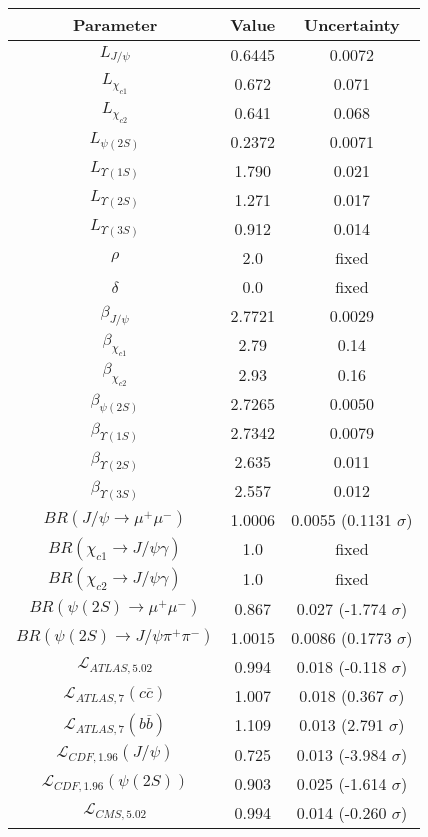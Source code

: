 \begin{table}[h!]
\centering
\begin{tabular}{c|c|c}
Parameter & Value & Uncertainty \\
\hline
$L_{J/\psi}$ & 0.6445 & 0.0072 \\
$L_{\chi_{c1}}$ & 0.672 & 0.071 \\
$L_{\chi_{c2}}$ & 0.641 & 0.068 \\
$L_{\psi(2S)}$ & 0.2372 & 0.0071 \\
$L_{\Upsilon(1S)}$ & 1.790 & 0.021 \\
$L_{\Upsilon(2S)}$ & 1.271 & 0.017 \\
$L_{\Upsilon(3S)}$ & 0.912 & 0.014 \\
$\rho$ & 2.0 & fixed \\
$\delta$ & 0.0 & fixed \\
$\beta_{J/\psi}$ & 2.7721 & 0.0029 \\
$\beta_{\chi_{c1}}$ & 2.79 & 0.14 \\
$\beta_{\chi_{c2}}$ & 2.93 & 0.16 \\
$\beta_{\psi(2S)}$ & 2.7265 & 0.0050 \\
$\beta_{\Upsilon(1S)}$ & 2.7342 & 0.0079 \\
$\beta_{\Upsilon(2S)}$ & 2.635 & 0.011 \\
$\beta_{\Upsilon(3S)}$ & 2.557 & 0.012 \\
$BR(J/\psi\rightarrow\mu^+\mu^-)$ & 1.0006 & 0.0055 (0.1131 $\sigma$) \\
$BR(\chi_{c1}\rightarrow J/\psi\gamma)$ & 1.0 & fixed \\
$BR(\chi_{c2}\rightarrow J/\psi\gamma)$ & 1.0 & fixed \\
$BR(\psi(2S)\rightarrow\mu^+\mu^-)$ & 0.867 & 0.027 (-1.774 $\sigma$) \\
$BR(\psi(2S)\rightarrow J/\psi\pi^+\pi^-)$ & 1.0015 & 0.0086 (0.1773 $\sigma$) \\
$\mathcal L_{ATLAS,5.02}$ & 0.994 & 0.018 (-0.118 $\sigma$) \\
$\mathcal L_{ATLAS,7}(c\overline c)$ & 1.007 & 0.018 (0.367 $\sigma$) \\
$\mathcal L_{ATLAS,7}(b\overline b)$ & 1.109 & 0.013 (2.791 $\sigma$) \\
$\mathcal L_{CDF,1.96}(J/\psi)$ & 0.725 & 0.013 (-3.984 $\sigma$) \\
$\mathcal L_{CDF,1.96}(\psi(2S))$ & 0.903 & 0.025 (-1.614 $\sigma$) \\
$\mathcal L_{CMS,5.02}$ & 0.994 & 0.014 (-0.260 $\sigma$) \\

\end{tabular}
\end{table}
